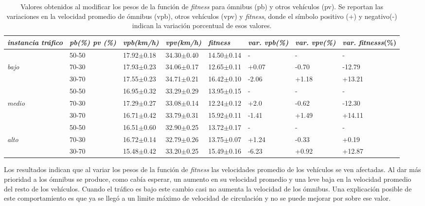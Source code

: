 \begin{table}[H]
	\renewcommand{\arraystretch}{1.2}
	\caption[Valores obtenidos al modificar los pesos de la función de \emph{fitness}.]{Valores obtenidos al modificar los pesos de la función de \emph{fitness} para ómnibus (pb) y otros vehículos (pv). Se reportan las variaciones en la velocidad promedio de ómnibus (vpb), otros vehículos (vpv) y \emph{fitness}, donde el símbolo positivo (+) y negativo(-) indican la variación porcentual de esos valores. }
	\label{table:analisis_fitness}
	\centering
	\begin{tabular}{p{1.2cm}p{1.2cm}p{1.8cm}p{1.8cm}p{1.8cm}p{1.1cm}p{1.1cm}p{1.2cm} }
		\hline
		\textit{instancia} \newline \textit{tráfico} &
		\textit{pb(\%) pv (\%)}& 
		\textit{vpb(km/h)} & 
		\textit{vpv(km/h)} &
		\textit{fitness} &
		\textit{var. \newline vpb(\%)} &
		\textit{var. \newline vpv(\%)} &
		\textit{var.} \newline \emph{fitnesss}(\%)
		\\ 
		\hline
		& 50-50  & 17.92$\pm$0.18 & 34.30$\pm$0.40 & 14.50$\pm$0.14  &- & - & -\\		
		\textit{bajo} & 70-30  & 17.93$\pm$0.23 & 34.06$\pm$0.17 & 12.65$\pm$0.11  & +0.07 & -0.70 & -12.79\\		
		& 30-70 & 17.55$\pm$0.23 & 34.71$\pm$0.21 & 16.42$\pm$0.10  & -2.06 & +1.18 & +13.21\\
		\hline
		
		& 50-50  & 16.95$\pm$0.32 & 33.29$\pm$0.29 & 13.95$\pm$0.15  &- & - & -\\		
		\textit{medio} & 70-30  & 17.29$\pm$0.27 & 33.08$\pm$0.14 & 12.24$\pm$0.12  & +2.0 & -0.62 & -12.30\\		
		& 30-70 & 16.71$\pm$0.42 & 33.79$\pm$0.31 & 15.92$\pm$0.11  & -1.41 & +1.49& +14.11\\
		
		\hline
		& 50-50  & 16.51$\pm$0.60 & 32.90$\pm$0.25 & 13.72$\pm$0.17  &- & - & -\\		
		\textit{alto} & 70-30  & 16.72$\pm$0.14 & 32.79$\pm$0.26 & 13.75$\pm$0.07  & +1.24 & -0.33 & +0.19\\	
		& 30-70 & 15.48$\pm$0.42 & 33.20$\pm$0.25 & 15.49$\pm$0.16  & -6.23 & +0.92 & +12.87\\
		\hline
	\end{tabular}
\end{table}


Los resultados indican que al variar los pesos de la función de \emph{fitness} las velocidades promedio de los vehículos se ven afectadas. Al dar más prioridad a los ómnibus se produce, como cabía esperar, un aumento en su velocidad promedio y una leve baja en la velocidad promedio del resto de los vehículos. Cuando el tráfico es bajo este cambio casi no aumenta la velocidad de los ómnibus. Una explicación posible de este comportamiento es que ya se llegó a un limite máximo de velocidad de circulación y no se puede mejorar por sobre ese valor.

